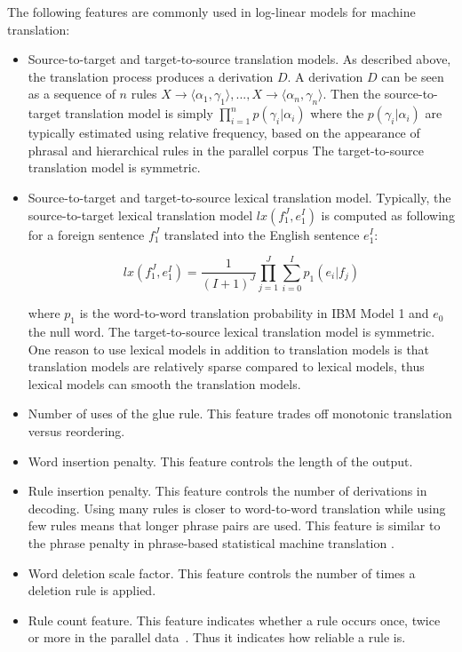     The following features are commonly used in log-linear models for machine translation:
%    
    \begin{itemize}
      \item Source-to-target and target-to-source translation models. As described above, the 
        translation process produces a derivation $D$. A derivation $D$ can be seen
        as a sequence of $n$ rules 
        $X \rightarrow \langle \alpha_1, \gamma_1 \rangle, ..., X \rightarrow \langle \alpha_n, \gamma_n \rangle$.
        Then the source-to-target translation model is simply $\prod_{i=1}^n p(\gamma_i|\alpha_i)$ where
        the $p(\gamma_i|\alpha_i)$ are typically estimated using relative frequency, based on the appearance 
        of phrasal and hierarchical rules in the parallel corpus
        The target-to-source 
        translation model is symmetric.
      \item Source-to-target and target-to-source lexical translation model. Typically, the source-to-target lexical translation
        model $lx(f_1^J,e_1^I)$ is computed as following for a foreign sentence $f_1^J$ translated into the English sentence $e_1^I$:

        \begin{equation} \label{eq:lexfeature}
          lx(f_1^J,e_1^I) = \frac{1}{(I+1)^J}\prod_{j=1}^{J} \sum_{i=0}^{I} p_1(e_i|f_j)
        \end{equation}

        \noindent where $p_1$ is the word-to-word translation probability in IBM Model 1 and $e_0$ the null word. The target-to-source lexical translation model is symmetric. One reason to use lexical models in addition to translation models is that translation models are relatively sparse compared
        to lexical models, thus lexical models can smooth the translation models.

      \item Number of uses of the glue rule. This feature trades off monotonic translation versus reordering.
      \item Word insertion penalty. This feature controls the length of the output.
      \item Rule insertion penalty. This feature controls the number of derivations in decoding. Using many rules is closer to word-to-word
        translation while using few rules means that longer phrase pairs are used. This feature is similar to the phrase penalty in phrase-based
        statistical machine translation \cite{koehn-och-marcu:2003:NAACL}.
      \item Word deletion scale factor. This feature controls the number of times a deletion rule is applied.
      \item Rule count feature. This feature indicates 
        whether a rule occurs once, twice or more in the parallel data~\citep{bender:07}. Thus it indicates how reliable a rule is.
    \end{itemize}

